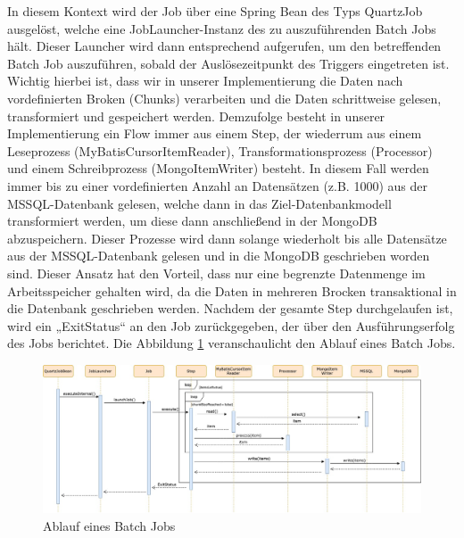 In diesem Kontext wird der Job über eine Spring Bean des Typs QuartzJob ausgelöst, welche eine JobLauncher-Instanz des zu auszuführenden Batch Jobs hält. Dieser Launcher wird dann entsprechend aufgerufen, um den betreffenden Batch Job auszuführen, sobald der Auslösezeitpunkt des Triggers eingetreten ist. Wichtig hierbei ist, dass wir in unserer Implementierung die Daten nach vordefinierten Broken (Chunks) verarbeiten und die Daten schrittweise gelesen, transformiert und gespeichert werden. Demzufolge besteht in unserer Implementierung ein Flow immer aus einem Step, der wiederrum aus einem Leseprozess (MyBatisCursorItemReader), Transformationsprozess (Processor) und einem Schreibprozess (MongoItemWriter) besteht. In diesem Fall werden immer bis zu einer vordefinierten Anzahl an Datensätzen (z.B. 1000) aus der MSSQL-Datenbank gelesen, welche dann in das Ziel-Datenbankmodell transformiert werden, um diese dann anschließend in der MongoDB abzuspeichern. Dieser Prozesse wird dann solange wiederholt bis alle Datensätze aus der MSSQL-Datenbank gelesen und in die MongoDB geschrieben worden sind. Dieser Ansatz hat den Vorteil, dass nur eine begrenzte Datenmenge im Arbeitsspeicher gehalten wird, da die Daten in mehreren Brocken transaktional in die Datenbank geschrieben werden. Nachdem der gesamte Step durchgelaufen ist, wird ein „ExitStatus“ an den Job zurückgegeben, der über den Ausführungserfolg des Jobs berichtet. Die Abbildung \ref{fig:Ablauf eines Batch Jobs} veranschaulicht den Ablauf eines Batch Jobs.

\begin{figure}[!h]
\centering
\includegraphics[width=15cm]{images/00_software_architecture/03_job_scheduling_process/job_execution_process.jpg}
\caption{Ablauf eines Batch Jobs}
\label{fig:Ablauf eines Batch Jobs}
\end{figure}